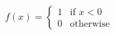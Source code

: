 \documentclass[preview]{standalone}
\begin{document}
\begin{align*}
f(x) =\begin{cases}1 & \text{if } x < 0 \\0 & \text{otherwise}\end{cases}
\end{align*}
\end{document}
